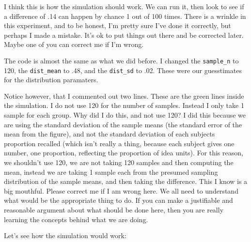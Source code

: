 \documentclass[]{book}
\theoremstyle{definition}
\theoremstyle{definition}
\theoremstyle{definition}
\theoremstyle{remark}
\begin{document}
I think this is how the simulation should work. We can run it, then look
to see if a difference of .14 can happen by chance 1 out of 100 times.
There is a wrinkle in this experiment, and to be honest, I'm pretty sure
I've done it correctly, but perhaps I made a mistake. It's ok to put
things out there and be corrected later. Maybe one of you can correct me
if I'm wrong.

The code is almost the same as what we did before. I changed the
\texttt{sample\_n} to 120, the \texttt{dist\_mean} to .48, and the
\texttt{dist\_sd} to .02. These were our guesstimates for the
distribution paramaters.

Notice however, that I commented out two lines. These are the green
lines inside the simulation. I do not use 120 for the number of samples.
Instead I only take 1 sample for each group. Why did I do this, and not
use 120? I did this because we are using the standard deviation of the
sample means (the standard error of the mean from the figure), and not
the standard deviation of each subjects proportion recalled (which isn't
really a thing, because each subject gives one number, one proportion,
reflecting the proportion of idea units). For this reason, we shouldn't
use 120, we are not taking 120 samples and then computing the mean,
instead we are taking 1 sample each from the presumed sampling
distribution of the sample means, and then taking the difference. This I
know is a big mouthful. Please correct me if I am wrong here. We all
need to understand what would be the appropriate thing to do. If you can
make a justifiable and reasonable argument about what should be done
here, then you are really learning the concepts behind what we are
doing.

Let's see how the simulation would work:
\end{document}

